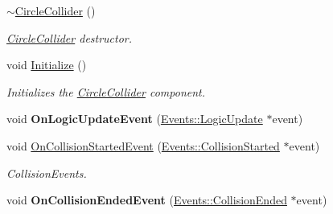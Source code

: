 \begin{DoxyCompactItemize}
\item 
\hyperlink{classDCEngine_1_1Components_1_1CircleCollider_a531609803e58204df4bd0ae87cbb2a6c}{$\sim$\-Circle\-Collider} ()
\begin{DoxyCompactList}\small\item\em \hyperlink{classDCEngine_1_1Components_1_1CircleCollider}{Circle\-Collider} destructor. \end{DoxyCompactList}\item 
void \hyperlink{classDCEngine_1_1Components_1_1CircleCollider_ae73db7b317b8459a7213270b74254375}{Initialize} ()
\begin{DoxyCompactList}\small\item\em Initializes the \hyperlink{classDCEngine_1_1Components_1_1CircleCollider}{Circle\-Collider} component. \end{DoxyCompactList}\item 
\hypertarget{classDCEngine_1_1Components_1_1CircleCollider_a58c5da0a0a551eadb66404466e8919c2}{void {\bfseries On\-Logic\-Update\-Event} (\hyperlink{classDCEngine_1_1Events_1_1LogicUpdate}{Events\-::\-Logic\-Update} $\ast$event)}\label{classDCEngine_1_1Components_1_1CircleCollider_a58c5da0a0a551eadb66404466e8919c2}

\item 
\hypertarget{classDCEngine_1_1Components_1_1CircleCollider_a5e339d4f1e6707df3aff225ec99408e0}{void \hyperlink{classDCEngine_1_1Components_1_1CircleCollider_a5e339d4f1e6707df3aff225ec99408e0}{On\-Collision\-Started\-Event} (\hyperlink{classDCEngine_1_1Events_1_1CollisionStarted}{Events\-::\-Collision\-Started} $\ast$event)}\label{classDCEngine_1_1Components_1_1CircleCollider_a5e339d4f1e6707df3aff225ec99408e0}

\begin{DoxyCompactList}\small\item\em Collision\-Events. \end{DoxyCompactList}\item 
\hypertarget{classDCEngine_1_1Components_1_1CircleCollider_ab1c1a21c469b4de979514d10c20d9f73}{void {\bfseries On\-Collision\-Ended\-Event} (\hyperlink{classDCEngine_1_1Events_1_1CollisionEnded}{Events\-::\-Collision\-Ended} $\ast$event)}\label{classDCEngine_1_1Components_1_1CircleCollider_ab1c1a21c469b4de979514d10c20d9f73}

\end{DoxyCompactItemize}
